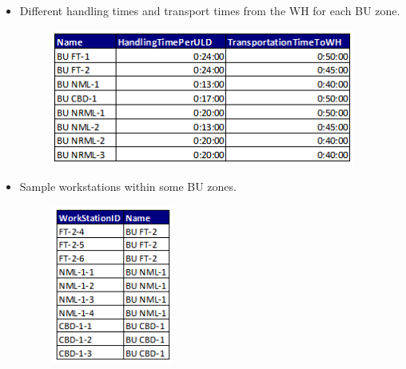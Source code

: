 \documentclass[11pt,a4paper,fleqn]{article}
\begin{document}
\begin{itemize}
	\item Different handling times and transport times from the WH for each BU zone.
	
	\begin{figure}[hbt!]
		\centering
		\includegraphics[width=100mm,scale=1.5]{buzone_data1.png}
	\end{figure}

\end{itemize}


\begin{itemize}

	\item Sample workstations within some BU zones.
	
	\begin{figure}[hbt!]
		\centering
		\includegraphics[width=40mm,scale=1.0]{sample_ws_bu.png}
	\end{figure}

\end{itemize}
\end{document}
